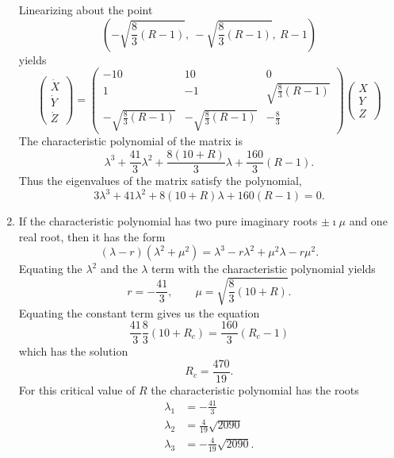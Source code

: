 \begin{Solution}
\begin{enumerate}
    Linearizing about the point
    \[\left(-\sqrt{\frac{8}{3}(R-1)},\ -\sqrt{\frac{8}{3}(R-1)},\ R-1\right)\]
    yields
    \[
    \begin{pmatrix}
      \dot{X} \\
      \dot{Y} \\
      \dot{Z}
    \end{pmatrix}
    =
    \begin{pmatrix}
      -10     & 10    & 0     \\
      1       & -1    & \sqrt{\frac{8}{3}(R-1)} \\
      -\sqrt{\frac{8}{3}(R-1)} & -\sqrt{\frac{8}{3}(R-1)} & -\frac{8}{3}
    \end{pmatrix}
    \begin{pmatrix}
      X \\
      Y \\
      Z
    \end{pmatrix}
    \]
    The characteristic polynomial of the matrix is
    \[ \lambda^3 + \frac{41}{3} \lambda^2 + \frac{8(10+R)}{3} \lambda
    + \frac{160}{3}(R-1). \]
    Thus the eigenvalues of the matrix satisfy the polynomial,
    \[ 
    3 \lambda^3 + 41 \lambda^2 + 8(10+R) \lambda + 160(R-1) = 0. 
    \]
  \item
    If the characteristic polynomial has two pure imaginary roots $\pm \imath \mu$
    and one real root, then it has the form
    \[ (\lambda-r)(\lambda^2+\mu^2) = \lambda^3 - r \lambda^2 + \mu^2 \lambda
    - r \mu^2. \]
    Equating the $\lambda^2$ and the $\lambda$ term with the characteristic
    polynomial yields
    \[ r = -\frac{41}{3}, \qquad \mu = \sqrt{\frac{8}{3}(10+R)}. \]
    Equating the constant term gives us the equation
    \[ \frac{41}{3} \frac{8}{3} (10+R_c) = \frac{160}{3} (R_c-1) \]
    which has the solution
    \[ R_c = \frac{470}{19}. \]
    For this critical value of $R$ the characteristic polynomial has the
    roots
    \begin{align*}
      \lambda_1 &= -\frac{41}{3} \\
      \lambda_2 &= \frac{4}{19} \sqrt{2090} \\
      \lambda_3 &= - \frac{4}{19} \sqrt{2090} .
    \end{align*}
  \end{enumerate}
\end{Solution}



